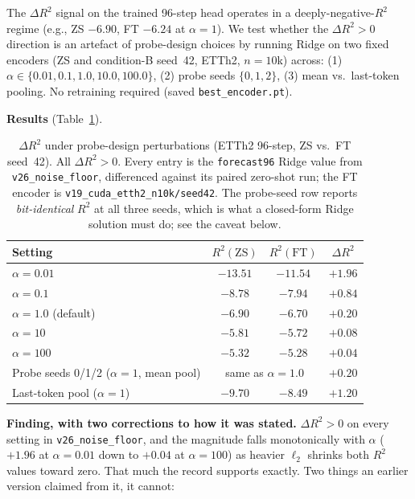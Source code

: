 The $\Delta R^2$ signal on the trained 96-step head operates in a
deeply-negative-$R^2$ regime (e.g., ZS $-6.90$, FT $-6.24$ at $\alpha{=}1$).
We test whether the $\Delta R^2{>}0$ direction is an artefact of probe-design
choices by running Ridge on two fixed encoders (ZS and condition-B seed~42,
ETTh2, $n{=}10$k) across: (1) $\alpha \in \{0.01, 0.1, 1.0, 10.0, 100.0\}$,
(2) probe seeds $\{0,1,2\}$, (3) mean vs.\ last-token pooling.
No retraining required (saved \texttt{best\_encoder.pt}).

\textbf{Results} (Table~\ref{tab:noisefloor}).
\begin{table}[!ht]
\centering
\vspace{-4pt}
\caption{$\Delta R^2$ under probe-design perturbations (ETTh2 96-step, ZS vs.\ FT
seed~42).  All $\Delta R^2 > 0$.  Every entry is the \texttt{forecast96} Ridge
value from \texttt{v26\_noise\_floor}, differenced against its paired
zero-shot run; the FT encoder is \texttt{v19\_cuda\_etth2\_n10k/seed42}.  The
probe-seed row reports \emph{bit-identical} $R^2$ at all three seeds, which is
what a closed-form Ridge solution must do; see the caveat below.}
\label{tab:noisefloor}
\small
\setlength{\tabcolsep}{3pt}
\begin{tabular}{lccc}
\toprule
Setting & $R^2(\text{ZS})$ & $R^2(\text{FT})$ & $\Delta R^2$ \\
\midrule
$\alpha{=}0.01$ & $-13.51$ & $-11.54$ & $+1.96$ \\
$\alpha{=}0.1$  & $-8.78$  & $-7.94$  & $+0.84$ \\
$\alpha{=}1.0$ (default) & $-6.90$ & $-6.70$ & $+0.20$ \\
$\alpha{=}10$   & $-5.81$  & $-5.72$  & $+0.08$ \\
$\alpha{=}100$  & $-5.32$  & $-5.28$  & $+0.04$ \\
Probe seeds 0/1/2 ($\alpha{=}1$, mean pool) & \multicolumn{2}{c}{same as $\alpha{=}1.0$} & $+0.20$ \\
Last-token pool ($\alpha{=}1$) & $-9.70$ & $-8.49$ & $+1.20$ \\
\bottomrule
\end{tabular}
\vspace{-2pt}
\end{table}

\textbf{Finding, with two corrections to how it was stated.}
$\Delta R^2{>}0$ on every setting in \texttt{v26\_noise\_floor}, and the
magnitude falls monotonically with $\alpha$ ($+1.96$ at $\alpha{=}0.01$ down to
$+0.04$ at $\alpha{=}100$) as heavier $\ell_2$ shrinks both $R^2$ values toward
zero.  That much the record supports exactly.  Two things an earlier version
claimed from it, it cannot:

